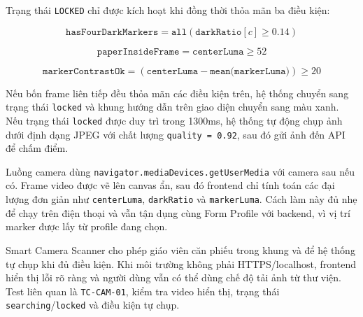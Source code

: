 Trạng thái \texttt{LOCKED} chỉ được kích hoạt khi đồng thời thỏa mãn ba điều kiện:

\begin{equation}
\texttt{hasFourDarkMarkers}
=
\texttt{all}(\texttt{darkRatio}[c] \geq 0.14)
\end{equation}

\begin{equation}
\texttt{paperInsideFrame}
=
\texttt{centerLuma} \geq 52
\end{equation}

\begin{equation}
\texttt{markerContrastOk}
=
(\texttt{centerLuma} - \texttt{mean(markerLuma)}) \geq 20
\end{equation}

Nếu bốn frame liên tiếp đều thỏa mãn các điều kiện trên, hệ thống chuyển sang trạng thái \texttt{locked} và khung hướng dẫn trên giao diện chuyển sang màu xanh. Nếu trạng thái \texttt{locked} được duy trì trong 1300ms, hệ thống tự động chụp ảnh dưới định dạng JPEG với chất lượng \texttt{quality = 0.92}, sau đó gửi ảnh đến API để chấm điểm.

Luồng camera dùng \texttt{navigator.mediaDevices.getUserMedia} với camera sau nếu có. Frame video được vẽ lên canvas ẩn, sau đó frontend chỉ tính toán các đại lượng đơn giản như \texttt{centerLuma}, \texttt{darkRatio} và \texttt{markerLuma}. Cách làm này đủ nhẹ để chạy trên điện thoại và vẫn tận dụng cùng Form Profile với backend, vì vị trí marker được lấy từ profile đang chọn.

Smart Camera Scanner cho phép giáo viên căn phiếu trong khung và để hệ thống tự chụp khi đủ điều kiện. Khi môi trường không phải HTTPS/localhost, frontend hiển thị lỗi rõ ràng và người dùng vẫn có thể dùng chế độ tải ảnh từ thư viện. Test liên quan là \texttt{TC-CAM-01}, kiểm tra video hiển thị, trạng thái \texttt{searching}/\texttt{locked} và điều kiện tự chụp.
